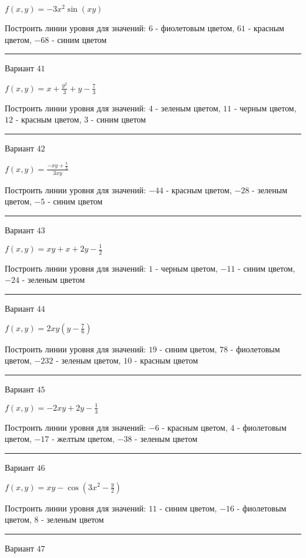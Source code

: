 \documentclass[11pt]{report}
\begin{document}
$f(x, y) = - 3 x^{2} \sin{\left(x y \right)}$

Построить линии уровня для значений: $6$ - фиолетовым цветом, $61$ - красным цветом, $-68$ - синим цветом
\begin{center}
\noindent\rule{8cm}{0.4pt}
\end{center}
Вариант $41$


$f(x, y) = x + \frac{y^{2}}{3} + y - \frac{7}{3}$

Построить линии уровня для значений: $4$ - зеленым цветом, $11$ - черным цветом, $12$ - красным цветом, $3$ - синим цветом
\begin{center}
\noindent\rule{8cm}{0.4pt}
\end{center}
Вариант $42$


$f(x, y) = \frac{- x y + \frac{5}{3}}{3 x y}$

Построить линии уровня для значений: $-44$ - красным цветом, $-28$ - зеленым цветом, $-5$ - синим цветом
\begin{center}
\noindent\rule{8cm}{0.4pt}
\end{center}
Вариант $43$


$f(x, y) = x y + x + 2 y - \frac{1}{2}$

Построить линии уровня для значений: $1$ - черным цветом, $-11$ - синим цветом, $-24$ - зеленым цветом
\begin{center}
\noindent\rule{8cm}{0.4pt}
\end{center}
Вариант $44$


$f(x, y) = 2 x y \left(y - \frac{7}{6}\right)$

Построить линии уровня для значений: $19$ - синим цветом, $78$ - фиолетовым цветом, $-232$ - зеленым цветом, $10$ - красным цветом
\begin{center}
\noindent\rule{8cm}{0.4pt}
\end{center}
Вариант $45$


$f(x, y) = - 2 x y + 2 y - \frac{1}{3}$

Построить линии уровня для значений: $-6$ - красным цветом, $4$ - фиолетовым цветом, $-17$ - желтым цветом, $-38$ - зеленым цветом
\begin{center}
\noindent\rule{8cm}{0.4pt}
\end{center}
Вариант $46$


$f(x, y) = x y - \cos{\left(3 x^{2} - \frac{y}{2} \right)}$

Построить линии уровня для значений: $11$ - синим цветом, $-16$ - фиолетовым цветом, $8$ - зеленым цветом
\begin{center}
\noindent\rule{8cm}{0.4pt}
\end{center}
Вариант $47$
\end{document}
